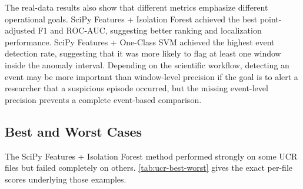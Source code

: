 The real-data results also show that different metrics emphasize different operational goals. SciPy Features + Isolation Forest achieved the best point-adjusted F1 and ROC-AUC, suggesting better ranking and localization performance. SciPy Features + One-Class SVM achieved the highest event detection rate, suggesting that it was more likely to flag at least one window inside the anomaly interval. Depending on the scientific workflow, detecting an event may be more important than window-level precision if the goal is to alert a researcher that a suspicious episode occurred, but the missing event-level precision prevents a complete event-based comparison.

\subsection{Best and Worst Cases}

The SciPy Features + Isolation Forest method performed strongly on some UCR files but failed completely on others. \cref{tab:ucr-best-worst} gives the exact per-file scores underlying those examples.

